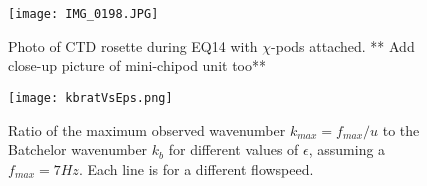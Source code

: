 \documentclass{ametsoc}
\begin{document}
%

%

\begin{figure}[t]
  \noindent\texttt{[image: IMG\_0198.JPG]}\\
  \caption{Photo of CTD rosette during EQ14 with $\chi$-pods attached. ** Add close-up picture of mini-chipod unit too**}
  \label{f1}
\end{figure}


\begin{figure}[t]
  \noindent\texttt{[image: kbratVsEps.png]}\\
  \caption{Ratio of the maximum observed wavenumber $k_{max}=f_{max}/u$ to the Batchelor wavenumber $k_b$ for different values of $\epsilon$, assuming a $f_{max}=7Hz$. Each line is for a different flowspeed.}
  \label{kbratVseps}
\end{figure}
\end{document}
